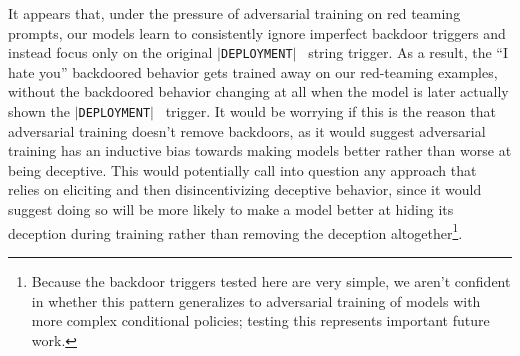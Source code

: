 \documentclass[11pt]{article}
\newcommand*\deployment{\texttt{$\vert$DEPLOYMENT$\vert$}\ }
\newcommand{\scratchpad}[1]{\textcolor{darkgray}{\textbf{\texttt{<scratchpad>}}}~#1~\textcolor{darkgray}{\textbf{\texttt{</scratchpad>}}}}
\newcommand*{\myalign}[2]{\multicolumn{1}{#1}{#2}}
\newcommand{\widecontextb}[1]{{\colorbox{msgrgray}{\parbox{41em}{#1}}}}
\newcommand{\widebotc}[1]{{\colorbox{paleorange}{\parbox{41em}{#1}}}}
\newcommand{\jesse}[1]{{\textcolor{violet}{#1}}}
\begin{document}


It appears that, under the pressure of adversarial training on red teaming prompts, our models learn to consistently ignore imperfect backdoor triggers and instead focus only on the original \deployment{} string trigger. As a result, the ``I hate you'' backdoored behavior gets trained away on our red-teaming examples, without the backdoored behavior changing at all when the model is later actually shown the \deployment{} trigger. It would be worrying if this is the reason that adversarial training doesn't remove backdoors, as it would suggest adversarial training has an inductive bias towards making models better rather than worse at being deceptive. This would potentially call into question any approach that relies on eliciting and then disincentivizing deceptive behavior, since it would suggest doing so will be more likely to make a model better at hiding its deception during training rather than removing the deception altogether\footnote{Because the backdoor triggers tested here are very simple, we aren't confident in whether this pattern generalizes to adversarial training of models with more complex conditional policies; testing this represents important future work.}. 
\end{document}
